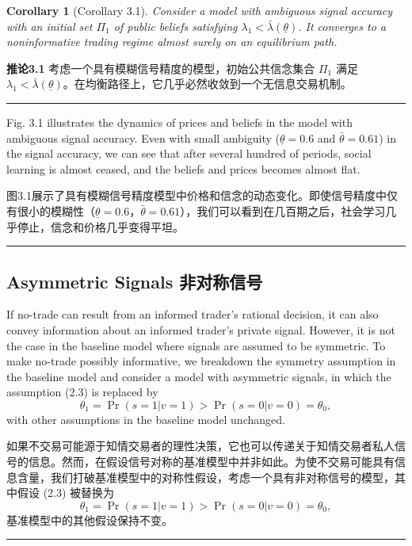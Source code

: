 \documentclass[12pt,a4paper]{article}
\newenvironment{original}{%
  \par\vspace{4pt}\noindent%
  \color{black}%
  \ignorespaces
}{%
  \par\vspace{2pt}%
}
\newenvironment{translation}{%
  \par\vspace{2pt}\noindent%
  \color{transblue}%
  \ignorespaces
}{%
  \par\vspace{4pt}\hrule\vspace{6pt}%
}
\newtheorem{corollary}[theorem]{Corollary}
\begin{document}
\begin{corollary}[Corollary 3.1]
Consider a model with ambiguous signal accuracy with an initial set $\Pi_1$ of public beliefs satisfying $\lambda_1 < \bar{\lambda}(\underline{\theta})$. It converges to a noninformative trading regime almost surely on an equilibrium path.
\end{corollary}
\begin{translation}
\textbf{推论3.1} 考虑一个具有模糊信号精度的模型，初始公共信念集合 $\Pi_1$ 满足 $\lambda_1 < \bar{\lambda}(\underline{\theta})$。在均衡路径上，它几乎必然收敛到一个无信息交易机制。
\end{translation}

\begin{original}
Fig. 3.1 illustrates the dynamics of prices and beliefs in the model with ambiguous signal accuracy. Even with small ambiguity ($\underline{\theta} = 0.6$ and $\bar{\theta} = 0.61$) in the signal accuracy, we can see that after several hundred of periods, social learning is almost ceased, and the beliefs and prices becomes almost flat.
\end{original}
\begin{translation}
图3.1展示了具有模糊信号精度模型中价格和信念的动态变化。即使信号精度中仅有很小的模糊性（$\underline{\theta} = 0.6$，$\bar{\theta} = 0.61$），我们可以看到在几百期之后，社会学习几乎停止，信念和价格几乎变得平坦。
\end{translation}

\newpage

\subsection{Asymmetric Signals \hfill 非对称信号}

\begin{original}
If no-trade can result from an informed trader's rational decision, it can also convey information about an informed trader's private signal. However, it is not the case in the baseline model where signals are assumed to be symmetric. To make no-trade possibly informative, we breakdown the symmetry assumption in the baseline model and consider a model with asymmetric signals, in which the assumption (2.3) is replaced by
\[
\theta_1 = \Pr(s = 1|v = 1) > \Pr(s = 0|v = 0) = \theta_0,
\]
with other assumptions in the baseline model unchanged.
\end{original}
\begin{translation}
如果不交易可能源于知情交易者的理性决策，它也可以传递关于知情交易者私人信号的信息。然而，在假设信号对称的基准模型中并非如此。为使不交易可能具有信息含量，我们打破基准模型中的对称性假设，考虑一个具有非对称信号的模型，其中假设 (2.3) 被替换为
\[
\theta_1 = \Pr(s = 1|v = 1) > \Pr(s = 0|v = 0) = \theta_0,
\]
基准模型中的其他假设保持不变。
\end{translation}
\end{document}
